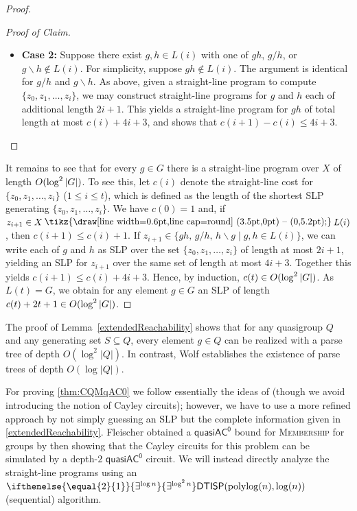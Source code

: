 \documentclass{article}
\newcommand{\algprobm}[1]{\textsc{#1}\xspace}
\newcommand{\betacc}[1]{\ifthenelse{\equal{#1}{1}}{\exists^{\log n}}{\exists^{\log^{#1}n}}} %
\newcommand{\abs}[1]{\left|\mathinner{#1}\right|}
\renewcommand{\setminus}{\mysetminus}
\newcommand{\mysetminusD}{\raisebox{.8pt}{\hbox{\tikz{\draw[line width=0.6pt,line cap=round] (3.5pt,0pt) -- (0,5.2pt);}}}}
\newcommand{\mysetminusT}{\mysetminusD}
\newcommand{\mysetminusS}{\raisebox{.5pt}{\hbox{\tikz{\draw[line width=0.45pt,line cap=round] (2.2pt,0) -- (0,3.8pt);}}}}
\newcommand{\mysetminusSS}{\raisebox{.35pt}{\hbox{\tikz{\draw[line width=0.4pt,line cap=round] (1.5pt,0) -- (0,2.8pt);}}}}
\newcommand{\mysetminus}{\mathbin{\mathchoice{\mysetminusD}{\mysetminusT}{\mysetminusS}{\mysetminusSS}}}
\newcommand*{\ComplexityClass}[1]{\ensuremath{\mathsf{#1}}\xspace}
\newcommand{\DTISP}{\ComplexityClass{DTISP}}
\newcommand{\DTISPpll}{\ensuremath{\DTISP(\mathrm{polylog}(n),\mathrm{log}(n))}\xspace}
\newcommand{\qACz}{\ComplexityClass{quasiAC^0}}
\begin{document}
\begin{proof}
\begin{proof}[Proof of Claim]
\begin{itemize}
    \item \textbf{Case 2:} Suppose there exist $g,h \in L(i)$ with one of $gh$, $g/h$, or $g\backslash h \not \in L(i)$. For simplicity, suppose $gh \not \in L(i).$ The argument is identical for $g/h$ and  $g\backslash h$. As above, given a straight-line program to compute $\{z_0, z_1, \ldots, z_i\}$, we may construct straight-line programs for $g$ and $h$ each of additional length $2i+1$. This yields a straight-line program for $gh$ of total length at most $c(i) + 4i+3$, and shows that $c(i+1) - c(i) \leq 4i+3$.\qedhere 
\end{itemize} 
\end{proof}

\fi

It remains to see that for every $g \in G$ there is a straight-line program over $X$ of length $O(\log^2 \abs{G})$. 
%
To see this, let $c(i)$ denote the straight-line cost for $\{z_0,z_{1}, \ldots, z_{i}\}$ ($1\leq i \leq t$), which is defined as the length of the shortest SLP generating $\{z_0,z_{1}, \ldots, z_{i}\}$. 
%
We have $c(0) = 1$ and, if $z_{i+1} \in X \setminus L(i)$, then $c(i+1) \leq c(i) + 1$. 
%
If $z_{i+1} \in \{ gh,\, g/h,\, h\backslash g\mid g,h \in L(i)\}$, we can write each of $g$ and $h$ as SLP over the set $\{z_0,z_{1}, \ldots, z_{i}\}$ of length at most $2i + 1$, yielding an SLP for $z_{i+1} $ over the same set of length at most $4i+3$. Together this yields $c(i+1) \leq c(i) + 4i+3$.
 Hence, by induction, $c(t) \in O(\log ^2\abs{G})$. As $L(t)= G$, we obtain for any element $g \in G$ an SLP of length $c(t) + 2t+1\in O(\log^2\abs{G})$. 
\end{proof}


\begin{remark}
The proof of Lemma~\ref{extendedReachability} shows that for any quasigroup $Q$ and any generating set $S \subseteq Q$, every element $g \in Q$ can be realized with a parse tree of depth $O(\log^2 |Q|)$. In contrast, Wolf \cite{Wolf} establishes the existence of parse trees of depth $O(\log |Q|)$.   
\end{remark}

For proving \cref{thm:CQMqAC0} we follow essentially the ideas of \cite{Fleischer} (though we avoid introducing the notion of Cayley circuits); however, we have to use a more refined approach by not simply guessing an SLP but the complete information given in \cref{extendedReachability}. Fleischer obtained a $\qACz$ bound for \algprobm{Membership} for groups by then showing that the Cayley circuits for this problem can be simulated by a depth-$2$ $\qACz$ circuit. We will instead directly analyze the straight-line programs using an $\betacc{2}\DTISPpll$ (sequential) algorithm.
\end{document}
